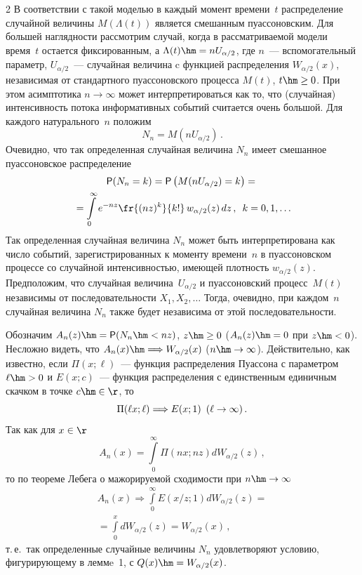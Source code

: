 \begin{multicols}{2}
В соответствии с такой моделью в каждый момент времени~$t$
распределение случайной величины $M(\Lambda(t))$ является смешанным
пуассоновским. Для большей наглядности рассмотрим случай, когда в
рассматриваемой модели время~$t$ остается фиксированным, а
$\Lambda(t)\hm=nU_{\alpha/2}$, где $n$~--- вспомогательный параметр,
$U_{\alpha/2}$~--- случайная величина c функцией распределения
$W_{\alpha/2}(x)$, независимая от стандартного пуассоновского
процесса $M(t)$, $t\hm\ge0$. При этом асимптотика $n\to\infty$ может
интерпретироваться как то, что (случайная) интенсивность потока
информативных событий считается очень большой. Для каждого
натурального~$n$ положим
$$
N_n=M(nU_{\alpha/2})\,.
$$
Очевидно, что так определенная случайная величина $N_n$ имеет
смешанное пуассоновское распределение
\begin{multline*}
{\sf P}(N_n=k)={\sf P}\left(M(nU_{\alpha/2})=k\right)={}\\
{}=\int\limits_0^{\infty}e^{-nz}\fr{(nz)^k}{k!}\,w_{\alpha/2}(z)\,dz\,,\enskip
 k=0,1,\ldots
\end{multline*}
Так определенная случайная величина $N_n$ может быть
интерпретирована как число событий, зарегистрированных к моменту
времени~$n$ в пуас\-со\-нов\-ском процессе со случайной интенсив\-ностью,
имеющей плотность $w_{\alpha/2}(z)$. Предположим, что случайная
величина~$U_{\alpha/2}$ и пуассоновский процесс~$M(t)$ независимы от
последовательности $X_1,X_2,\ldots$ Тогда, очевидно, при каждом~$n$
случайная величина $N_n$ также будет независима от этой
последовательности.

Обозначим $A_n(z)\hm={\sf P}(N_n\hm<nz)$, $z\hm\ge0$ ($A_n(z)\hm=0$ при $z\hm<0$).
Несложно видеть, что $A_n(x)\hm\Longrightarrow W_{\alpha/2}(x)$
($n\hm\to\infty$). Действительно, как известно, если $\Pi(x;\ell)$~---
функция распределения \mbox{Пуассона} с параметром $\ell\hm>0$ и $E(x;c)$~---
функция распределения с единственным единичным скачком в точке
$c\hm\in\r$, то
$$
\Pi(\ell x;\ell)\Longrightarrow E(x;1)\enskip (\ell\to\infty)\,.
$$
Так как для $x\in\r$
$$
A_n(x)=\int\limits_{0}^{\infty}\Pi\left(n x; n z\right)dW_{\alpha/2}(z)\,,
$$
то по теореме Лебега о мажорируемой сходимости при $n\hm\to\infty$
\begin{multline*}
A_n(x)\Longrightarrow\int\limits_{0}^{\infty}E\left(x/z;1\right)dW_{\alpha/2}(z)={}\\
{}=
\int\limits_{0}^{x}dW_{\alpha/2}(z)=W_{\alpha/2}(x)\,,
\end{multline*}
т.\,е.\ так определенные случайные величины $N_n$ удовле\-тво\-ря\-ют
условию, фигурирующему в леммe~1, с $Q(x)\hm=W_{\alpha/2}(x)$.


\end{multicols}

